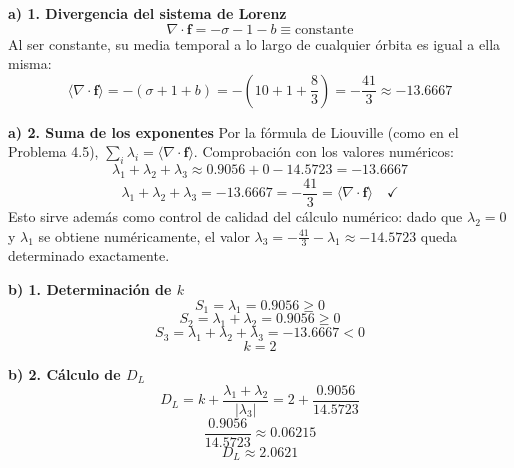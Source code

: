 \documentclass[11pt,a4paper]{article}
\newenvironment{solucion}[1][Solución Detallada]{%
    \vspace{1.5mm}%
    \noindent{\large\textbf{Solución:}}\par\vspace{1.5mm}%
}{%
    \par\vspace{3mm}%
}
\begin{document}
\begin{solucion}

\textbf{\large a) 1. Divergencia del sistema de Lorenz}
\[
\nabla\cdot\mathbf{f} = -\sigma - 1 - b \equiv \text{constante}
\]
Al ser constante, su media temporal a lo largo de cualquier órbita es igual a ella misma:
\[
\langle\nabla\cdot\mathbf{f}\rangle = -(\sigma + 1 + b) = -\left(10 + 1 + \frac{8}{3}\right) = -\frac{41}{3} \approx -13.6667
\]

\vspace{3.5mm}

\textbf{\large a) 2. Suma de los exponentes}
Por la fórmula de Liouville (como en el Problema 4.5), $\sum_i \lambda_i = \langle\nabla\cdot\mathbf{f}\rangle$. Comprobación con los valores numéricos:
\[
\lambda_1 + \lambda_2 + \lambda_3 \approx 0.9056 + 0 - 14.5723 = -13.6667
\]
\[
\boxed{\lambda_1 + \lambda_2 + \lambda_3 = -13.6667 = -\frac{41}{3} = \langle\nabla\cdot\mathbf{f}\rangle \quad \checkmark}
\]
Esto sirve además como control de calidad del cálculo numérico: dado que $\lambda_2 = 0$ y $\lambda_1$ se obtiene numéricamente, el valor $\lambda_3 = -\tfrac{41}{3} - \lambda_1 \approx -14.5723$ queda determinado exactamente.

\vspace{3.5mm}

\textbf{\large b) 1. Determinación de $k$}
\[
S_1 = \lambda_1 = 0.9056 \ge 0
\]
\[
S_2 = \lambda_1 + \lambda_2 = 0.9056 \ge 0
\]
\[
S_3 = \lambda_1 + \lambda_2 + \lambda_3 = -13.6667 < 0
\]
\[
\boxed{k = 2}
\]

\vspace{3.5mm}

\textbf{\large b) 2. Cálculo de $D_L$}
\[
D_L = k + \frac{\lambda_1 + \lambda_2}{|\lambda_3|} = 2 + \frac{0.9056}{14.5723}
\]
\[
\frac{0.9056}{14.5723} \approx 0.06215
\]
\[
\boxed{D_L \approx 2.0621}
\]

\vspace{3.5mm}


\end{solucion}
\end{document}
